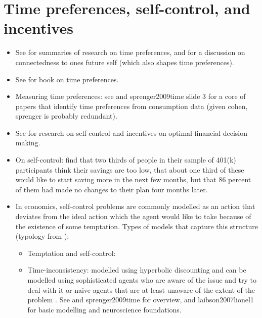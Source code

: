 \documentclass[a4paper, 11pt]{report}
\begin{document}
\section{Time preferences, self-control, and incentives}
\begin{itemize}
	\item See \citet{agarwal2017shapes, greenberg2019financial} for summaries of research on time preferences, and \citet{greenberg2019financial} for a discussion on connectedness to ones future self (which also shapes time preferences).

	\item See \citet{loewenstein2003time} for book on time preferences.

	\item Measuring time preferences: see \citet{cohen2016measuring} and sprenger2009time slide 3 for a core of papers that identify time preferences from consumption data (given cohen, sprenger is probably redundant).

	\item See \citet{agarwal2017shapes} for research on self-control and incentives on optimal financial decision making.

	\item On self-control: \citet{choi2004better} find that two thirds of people in their sample of 401(k) participants think their savings are too low, that about one third of these would like to start saving more in the next few months, but that 86 percent of them had made no changes to their plan four months later.

	\item In economics, self-control problems are commonly modelled as an action that deviates from the ideal action which the agent would like to take because of the existence of some temptation. Types of models that capture this structure (typology from \citet{ameriks2007measuring}):
	\begin{itemize}
		\item Temptation and self-control: \citet{gul2001temptation}

		\item Time-inconsistency: modelled using hyperbolic discounting \citep{ainslie1975specious} and can be modelled using sophisticated agents who are aware of the issue and try to deal with it \citep{laibson1997golden} or naive agents that are at least unaware of the extent of the problem \citep{o1999doing, o2001choice}. See \citet{frederick2002time} and sprenger2009time  for overview, and laibson2007lionel1 for basic modelling and neuroscience foundations.


\end{itemize}
\end{itemize}
\end{document}
